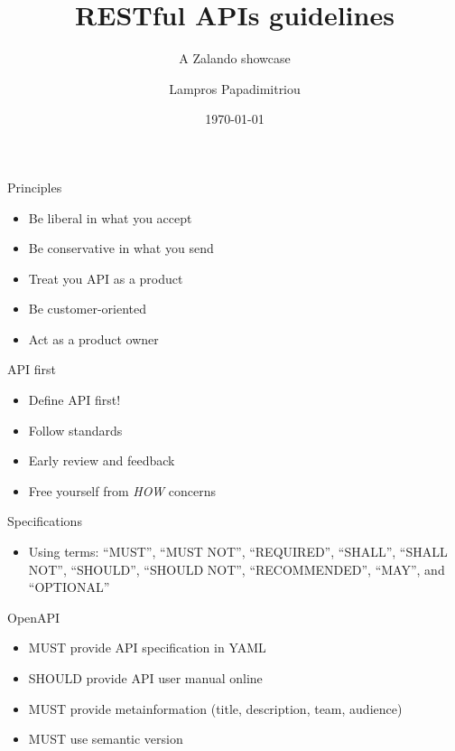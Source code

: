 \documentclass[10pt]{beamer}
\title{RESTful APIs guidelines}
\subtitle{A Zalando showcase}
\date{\today}
\date{}
\author{Lampros Papadimitriou}
\institute{Check24 Baufinanzierung GmbH}
\begin{document}
\maketitle

\begin{frame}{Principles}

\begin{itemize}
\tightlist
\item
  Be liberal in what you accept
\item
  Be conservative in what you send
\item
  Treat you API as a product
\item
  Be customer-oriented
\item
  Act as a product owner
\end{itemize}

\end{frame}

\begin{frame}{API first}

\begin{itemize}
\tightlist
\item
  Define API first!
\item
  Follow standards
\item
  Early review and feedback
\item
  Free yourself from \emph{HOW} concerns
\end{itemize}

\end{frame}

\begin{frame}{Specifications}

\begin{itemize}
\tightlist
\item
  Using terms: ``MUST'', ``MUST NOT'', ``REQUIRED'', ``SHALL'', ``SHALL
  NOT'', ``SHOULD'', ``SHOULD NOT'', ``RECOMMENDED'', ``MAY'', and
  ``OPTIONAL''
\end{itemize}

\end{frame}

\begin{frame}{OpenAPI}

\begin{itemize}
\tightlist
\item
  MUST provide API specification in YAML
\item
  SHOULD provide API user manual online
\item
  MUST provide metainformation (title, description, team, audience)
\item
  MUST use semantic version
\end{itemize}

\end{frame}
\end{document}
